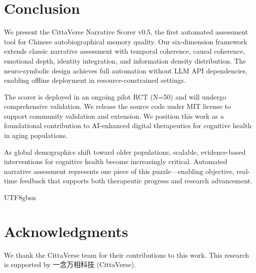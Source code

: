 \documentclass{article}
\begin{document}
\section{Conclusion}

We present the CittaVerse Narrative Scorer v0.5, the first automated assessment tool for Chinese autobiographical memory quality. Our six-dimension framework extends classic narrative assessment with temporal coherence, causal coherence, emotional depth, identity integration, and information density distribution. The neuro-symbolic design achieves full automation without LLM API dependencies, enabling offline deployment in resource-constrained settings.

The scorer is deployed in an ongoing pilot RCT (N=50) and will undergo comprehensive validation. We release the source code under MIT license to support community validation and extension. We position this work as a foundational contribution to AI-enhanced digital therapeutics for cognitive health in aging populations.

As global demographics shift toward older populations, scalable, evidence-based interventions for cognitive health become increasingly critical. Automated narrative assessment represents one piece of this puzzle---enabling objective, real-time feedback that supports both therapeutic progress and research advancement.

\begin{CJK}{UTF8}{gbsn}

\section*{Acknowledgments}

We thank the CittaVerse team for their contributions to this work. This research is supported by 一念万相科技 (CittaVerse).

\end{CJK}
\end{document}
